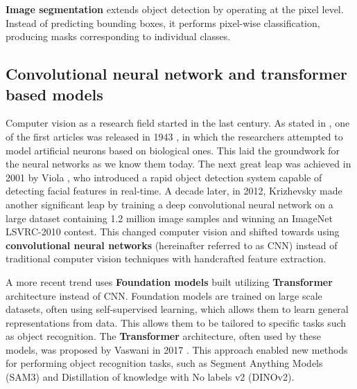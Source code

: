 \textbf{Image segmentation} extends object detection by operating at the pixel level. Instead of predicting bounding boxes, it performs pixel-wise classification, producing masks corresponding to individual classes.

\subsection{Convolutional neural network and transformer based models}

Computer vision as a research field started in the last century. As stated in \cite{computerVisionNX}, one of the first articles was released in 1943 \cite{mcculloch1943logical}, in which the researchers attempted to model artificial neurons based on biological ones. This laid the groundwork for the neural networks as we know them today. The next great leap was achieved in 2001 by Viola \cite{viola}, who introduced a rapid object detection system capable of detecting facial features in real-time. A decade later, in 2012, Krizhevsky \cite{krizhevsky} made another significant leap by training a deep convolutional neural network on a large dataset containing 1.2 million image samples and winning an ImageNet LSVRC-2010 contest. This changed computer vision and shifted towards using \textbf{convolutional neural networks} (hereinafter referred to as CNN) instead of traditional computer vision techniques with handcrafted feature extraction. 

A more recent trend uses \textbf{Foundation models} built utilizing \textbf{Transformer} architecture instead of CNN. Foundation models are trained on large scale datasets, often using self-supervised learning, which allows them to learn general representations from data. This allows them to be tailored to specific tasks such as object recognition. The \textbf{Transformer} architecture, often used by these models, was proposed by Vaswani in 2017 \cite{vaswani2017attention}. This approach enabled new methods for performing object recognition tasks, such as Segment Anything Models (SAM3) and Distillation of knowledge with No labels v2 (DINOv2).



